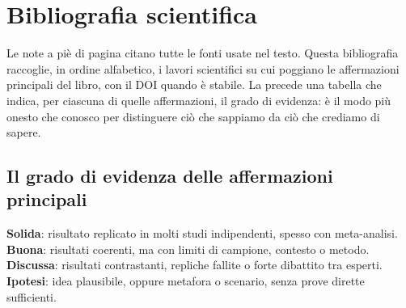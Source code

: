
\chapter*{Bibliografia scientifica}

Le note a piè di pagina citano tutte le fonti usate nel testo. Questa bibliografia raccoglie, in ordine alfabetico, i lavori scientifici su cui poggiano le affermazioni principali del libro, con il DOI quando è stabile. La precede una tabella che indica, per ciascuna di quelle affermazioni, il grado di evidenza: è il modo più onesto che conosco per distinguere ciò che sappiamo da ciò che crediamo di sapere.

\section*{Il grado di evidenza delle affermazioni principali}

\begin{concetto}[Legenda]
\textbf{Solida}: risultato replicato in molti studi indipendenti, spesso con meta-analisi.\\
\textbf{Buona}: risultati coerenti, ma con limiti di campione, contesto o metodo.\\
\textbf{Discussa}: risultati contrastanti, repliche fallite o forte dibattito tra esperti.\\
\textbf{Ipotesi}: idea plausibile, oppure metafora o scenario, senza prove dirette sufficienti.
\end{concetto}


